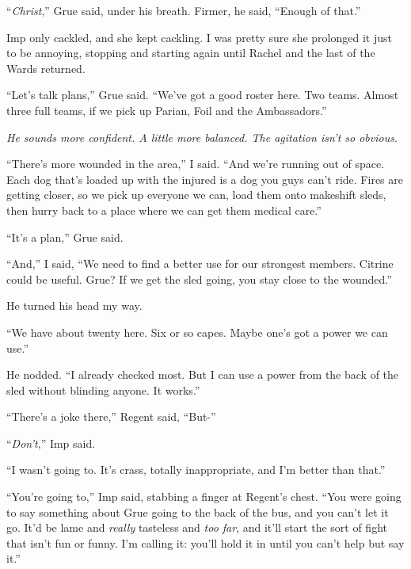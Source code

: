 ``\emph{Christ},'' Grue said, under his breath.  Firmer, he said, ``Enough of that.''



Imp only cackled, and she kept cackling.  I was pretty sure she prolonged it just to be annoying, stopping and starting again until Rachel and the last of the Wards returned.



``Let's talk plans,'' Grue said.  ``We've got a good roster here.  Two teams.  Almost three full teams, if we pick up Parian, Foil and the Ambassadors.''



\emph{He sounds more confident.  A little more balanced.  The agitation isn't so obvious}.



``There's more wounded in the area,'' I said.  ``And we're running out of space.  Each dog that's loaded up with the injured is a dog you guys can't ride.  Fires are getting closer, so we pick up everyone we can, load them onto makeshift sleds, then hurry back to a place where we can get them medical care.''



``It's a plan,'' Grue said.



``And,'' I said, ``We need to find a better use for our strongest members.  Citrine could be useful.  Grue?  If we get the sled going, you stay close to the wounded.''



He turned his head my way.



``We have about twenty here.  Six or so capes.  Maybe one's got a power we can use.''



He nodded.  ``I already checked most.  But I can use a power from the back of the sled without blinding anyone.  It works.''



``There's a joke there,'' Regent said, ``But-''



``\emph{Don't},'' Imp said.



``I wasn't going to.  It's crass, totally inappropriate, and I'm better than that.''



``You're going to,'' Imp said, stabbing a finger at Regent's chest.  ``You were going to say something about Grue going to the back of the bus, and you can't let it go.  It'd be lame and \emph{really} tasteless and \emph{too far}, and it'll start the sort of fight that isn't fun or funny.  I'm calling it: you'll hold it in until you can't help but say it.''



